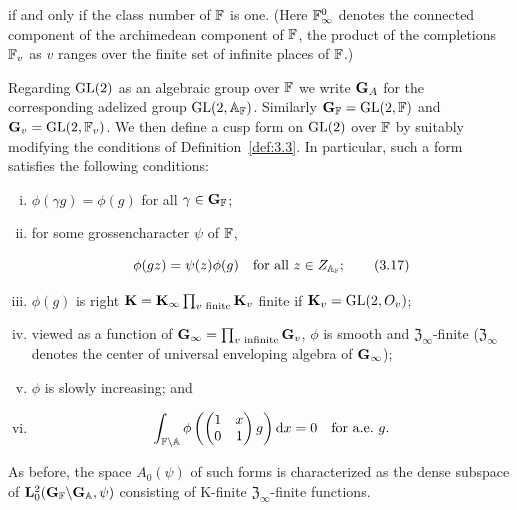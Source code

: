 if and only if the class number of $\mathbb{F}$ is one. (Here $\mathbb{F}_\infty^0$ denotes the connected component of the archimedean component of $\mathbb{F}$, the product of the completions $\mathbb{F}_v$ as $v$ ranges over the finite set of infinite places of $\mathbb{F}$.)

Regarding $\operatorname{GL}(2)$ as an algebraic group over $\mathbb{F}$ we write $\mathbf{G}_A$ for the corresponding adelized group $\operatorname{GL}(2,\mathbb{A}_{\mathbb{F}})$. Similarly $\mathbf{G}_{\mathbb{F}} = \operatorname{GL}(2,\mathbb{F})$ and $\mathbf{G}_v = \operatorname{GL}(2,\mathbb{F}_v)$. We then define a cusp form on $\operatorname{GL}(2)$ over $\mathbb{F}$ by suitably modifying the conditions of Definition~\ref{def:3.3}. In particular, such a form satisfies the following conditions:

\begin{enumerate}[(i)]

\item $\phi(\gamma g) = \phi(g)$ for all $\gamma \in \mathbf{G}_{\mathbb{F}}$;

\item for some grossencharacter $\psi$ of $\mathbb{F}$,

\begin{equation}\label{eq:3.17}
\phi(gz) = \psi(z)\phi(g) \quad \text{for all } z \in Z_{\mathbb{A}_{\mathbb{F}}};\tag{3.17}
\end{equation}

\item $\phi(g)$ is right $\mathbf{K} = \mathbf{K}_\infty\prod_{v\text{ finite}}\mathbf{K}_v$ finite if $\mathbf{K}_v = \operatorname{GL}(2,O_v)$;

\item viewed as a function of $\mathbf{G}_\infty = \prod_{v\text{ infinite}}\mathbf{G}_v$, $\phi$ is smooth and $\mathfrak{Z}_\infty$-finite ($\mathfrak{Z}_\infty$ denotes the center of universal enveloping algebra of $\mathbf{G}_\infty$);

\item $\phi$ is slowly increasing; and

\item

\[
\int_{\mathbb{F}\backslash\mathbb{A}}\phi\left(\begin{pmatrix} 1 & x \\ 0 & 1 \end{pmatrix}g\right)\mathrm{d} x = 0 \quad \text{for a.e.\ } g.
\]

\end{enumerate}

As before, the space $A_0(\psi)$ of such forms is characterized as the dense subspace of $\mathbf{L}_0^2(\mathbf{G}_{\mathbb{F}}\backslash\mathbf{G}_{\mathbb{A}},\psi)$ consisting of K-finite $\mathfrak{Z}_\infty$-finite functions.


